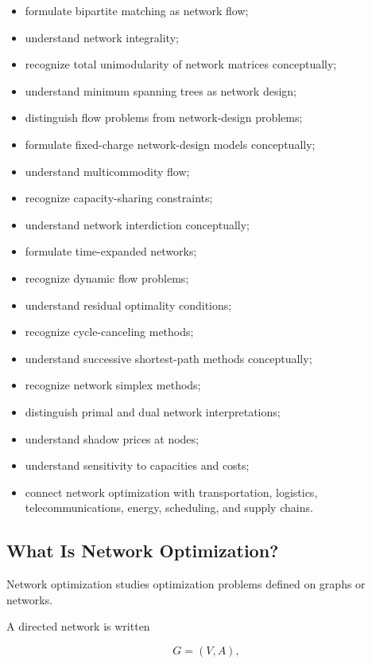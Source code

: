 {\begin{itemize}
    \item formulate bipartite matching as network flow;
    \item understand network integrality;
    \item recognize total unimodularity of network matrices conceptually;
    \item understand minimum spanning trees as network design;
    \item distinguish flow problems from network-design problems;
    \item formulate fixed-charge network-design models conceptually;
    \item understand multicommodity flow;
    \item recognize capacity-sharing constraints;
    \item understand network interdiction conceptually;
    \item formulate time-expanded networks;
    \item recognize dynamic flow problems;
    \item understand residual optimality conditions;
    \item recognize cycle-canceling methods;
    \item understand successive shortest-path methods conceptually;
    \item recognize network simplex methods;
    \item distinguish primal and dual network interpretations;
    \item understand shadow prices at nodes;
    \item understand sensitivity to capacities and costs;
    \item connect network optimization with transportation, logistics,
          telecommunications, energy, scheduling, and supply chains.
\end{itemize}
}

\subsection{What Is Network Optimization?}
\label{subsec:what-is-network-optimization}

Network optimization studies optimization problems defined on graphs or
networks.

A directed network is written

\[
\boxed{
G=(V,A),
}
\]

